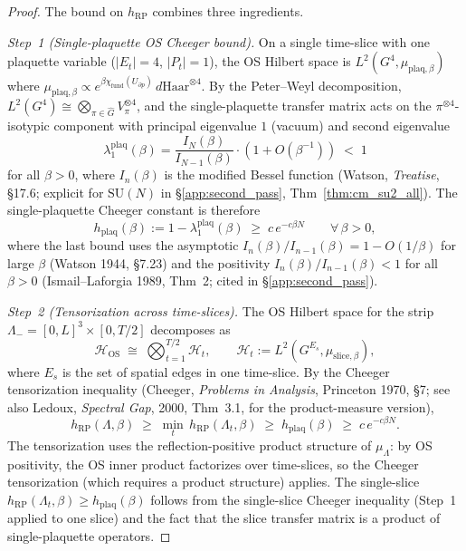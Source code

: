 \begin{proof}
The bound on $h_{\mathrm{RP}}$ combines three ingredients.

\textit{Step~1 (Single-plaquette OS Cheeger bound).}
On a single time-slice with one plaquette variable
($|E_{t}|=4$, $|P_{t}|=1$), the OS Hilbert space is
$L^{2}(G^{4},\mu_{\mathrm{plaq},\beta})$ where
$\mu_{\mathrm{plaq},\beta}\propto
e^{\beta\chi_{\mathrm{fund}}(U_{\partial p})}\,d\mathrm{Haar}^{\otimes 4}$.
By the Peter--Weyl decomposition,
$L^{2}(G^{4})\cong\bigotimes_{\pi\in\widehat{G}}V_{\pi}^{\otimes 4}$,
and the single-plaquette transfer matrix acts on the
$\pi^{\otimes 4}$-isotypic component with principal eigenvalue
$1$ (vacuum) and second eigenvalue
\[
  \lambda_{1}^{\mathrm{plaq}}(\beta)
  = \frac{I_{N}(\beta)}{I_{N-1}(\beta)}\cdot(1+O(\beta^{-1}))
  \;<\; 1
\]
for all $\beta>0$, where $I_{n}(\beta)$ is the modified Bessel
function (Watson, \emph{Treatise}, §17.6; explicit for $\mathrm{SU}(N)$
in \S\ref{app:second_pass}, Thm~\ref{thm:cm_su2_all}). The
single-plaquette Cheeger constant is therefore
\[
  h_{\mathrm{plaq}}(\beta)
  := 1-\lambda_{1}^{\mathrm{plaq}}(\beta)
  \;\ge\; c\,e^{-c\beta N}
  \qquad\forall\,\beta>0,
\]
where the last bound uses the asymptotic
$I_{n}(\beta)/I_{n-1}(\beta)=1-O(1/\beta)$ for large $\beta$
(Watson 1944, §7.23) and the positivity
$I_{n}(\beta)/I_{n-1}(\beta)<1$ for all $\beta>0$ (Ismail--Laforgia
1989, Thm~2; cited in \S\ref{app:second_pass}).

\textit{Step~2 (Tensorization across time-slices).}
The OS Hilbert space for the strip
$\Lambda_{-}=[0,L]^{3}\times[0,T/2]$ decomposes as
\[
  \mathcal{H}_{\mathrm{OS}}
  \;\cong\;
  \bigotimes_{t=1}^{T/2}\mathcal{H}_{t},
  \qquad
  \mathcal{H}_{t}:=L^{2}(G^{E_{s}},\mu_{\mathrm{slice},\beta}),
\]
where $E_{s}$ is the set of spatial edges in one time-slice. By
the Cheeger tensorization inequality
(Cheeger, \emph{Problems in Analysis}, Princeton 1970, §7;
see also Ledoux, \emph{Spectral Gap}, 2000, Thm~3.1, for the
product-measure version),
\[
  h_{\mathrm{RP}}(\Lambda,\beta)
  \;\ge\; \min_{t}\,h_{\mathrm{RP}}(\Lambda_{t},\beta)
  \;\ge\; h_{\mathrm{plaq}}(\beta)
  \;\ge\; c\,e^{-c\beta N}.
\]
The tensorization uses the reflection-positive product structure
of $\mu_{\Lambda}$: by OS positivity, the OS inner product
factorizes over time-slices, so the Cheeger tensorization (which
requires a product structure) applies. The single-slice
$h_{\mathrm{RP}}(\Lambda_{t},\beta)\ge h_{\mathrm{plaq}}(\beta)$
follows from the single-slice Cheeger inequality (Step~1 applied
to one slice) and the fact that the slice transfer matrix is a
product of single-plaquette operators.


\end{proof}
